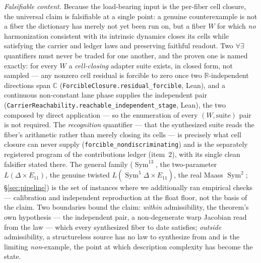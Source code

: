 \documentclass[11pt]{article}
\theoremstyle{definition}
\newcommand{\Sym}{\operatorname{Sym}}
\begin{document}
\emph{Falsifiable content.} Because the load-bearing input is the per-fiber cell closure, the universal claim is
falsifiable at a single point: a genuine counterexample is not a fiber the dictionary has merely not yet been run
on, but a fiber $W$ for which \emph{no} harmonization consistent with its intrinsic dynamics closes its cells
while satisfying the carrier and ledger laws and preserving faithful readout. Two $\forall\exists$
quantifiers must never be traded for one another, and the proven one is named exactly: for every
$W$ a \emph{cell-closing} adapter suite exists, in closed form, not sampled --- any nonzero cell
residual is forcible to zero once two
$\mathbb R$-independent directions span $\mathbb C$ (\texttt{ForcibleClosure.residual\_forcible},
Lean), and a continuous non-constant lane phase supplies the independent pair
(\texttt{CarrierReachability.reachable\_independent\_stage}, Lean), the two composed by direct
application --- so the enumeration of every $(W,\text{suite})$ pair is not required.  The
\emph{recognition} quantifier --- that the synthesized suite reads the fiber's arithmetic rather
than merely closing its cells --- is precisely what cell closure can never supply
(\texttt{forcible\_nondiscriminating}) and is the separately registered program of the
contributions ledger (item~2), with its single clean falsifier stated there. The general family
($\Sym^{13}$, the two-parameter $L(\Delta\times E_{11})$, the genuine twisted $L(\Sym^5\Delta\times E_{11})$, the real Maass $\Sym^2$; \S\ref{sec:pipeline})
is the set of instances where we additionally ran empirical checks --- calibration and independent
reproduction at the float floor, not the basis of the claim. Two boundaries bound the claim:
\emph{within} admissibility, the theorem's own hypothesis --- the independent pair, a non-degenerate
warp Jacobian read from the law --- which every synthesized fiber to date satisfies; \emph{outside}
admissibility, a structureless source has no law to synthesize from and is the limiting
\emph{non}-example, the point at which description complexity has become the state.
\end{document}
